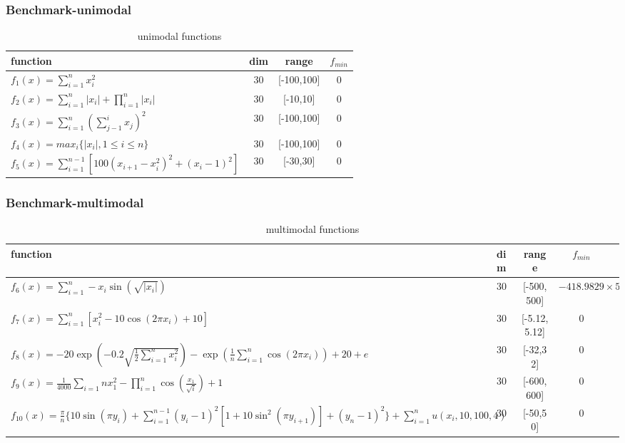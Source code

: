 \begin{frame}
	\frametitle{Benchmark-unimodal}
	\begin{table}[]
	\centering
	\caption{unimodal functions}
	\label{wolf_table1}
	\begin{tabular}{lccc}
	\hline
	function & dim & range & $f_{min}$ \\ \hline \hline
	$f_1(x)=\sum_{i=1}^{n}x_i^2$ & 30 &  [-100,100]  & 0  \\ \hline
	$f_2(x)=\sum_{i=1}^{n}|x_i|+\prod_{i=1}^{n}|x_i|$ & 30 & [-10,10] & 0 \\ \hline
	$f_3(x)=\sum_{i=1}^{n}(\sum_{j-1}^{i} x_j)^2$ & 30  & [-100,100] &  0 \\ \hline
	$f_4(x)=max_i\{|x_i|,1 \leq i\leq n\}$ & 30 & [-100,100] &  0 \\ \hline
	$f_5(x)=\sum_{i=1}^{n-1}[100(x_{i+1}-x_i^2)^2+(x_i-1)^2]$ & 30 & [-30,30] &  0 \\ \hline
	\end{tabular}
	\end{table}
\end{frame}


\begin{frame}
	\frametitle{Benchmark-multimodal}
	\begin{table}[]
	\centering
	\caption{multimodal functions}
	\label{wolf_table2}
	\begin{tabular}{p{8cm}lccc}  
	\hline
	function & dim & range & $f_{min}$ \\ \hline \hline
	$f_6(x)=\sum_{i=1}^{n} -x_i \sin (\sqrt{|x_i|})$ & 30 &  [-500,500]  & $-418.9829 \times 5$ \\ \hline
	$f_7(x)=\sum_{i=1}^{n}[x_i^2-10\cos (2 \pi x_i)+10]$ & 30 & [-5.12,5.12] & 0 \\ \hline
	$f_8(x)=-20\exp{\left(-0.2\sqrt{\frac{1}{2}\sum_{i=1}^{n}x_i^2}\right)}- \exp{\left(\frac{1}{n}\sum_{i=1}^{n}\cos(2\pi x_i)\right)+20+e}$ & 30  & [-32,32] &  0 \\ \hline
	$f_9(x)=\frac{1}{4000}\sum_{i=1}{n}x_1^2-\prod_{i=1}^{n}\cos\left(\frac{x_1}{\sqrt{i}} \right)+1 $ & 30 & [-600,600] &  0 \\ \hline
	$f_{10}(x)=\frac{\pi}{n}\{10\sin(\pi y_i)+\sum_{i=1}^{n-1}(y_i-1)^2  [1+10{\sin}^2(\pi y_{i+1})]+(y_n-1)^2\}+\sum_{i=1}^{n}u(x_i,10,100,4) $ & 30 & [-50,50] &  0 \\ \hline
	\end{tabular}
	\end{table}
\end{frame}



